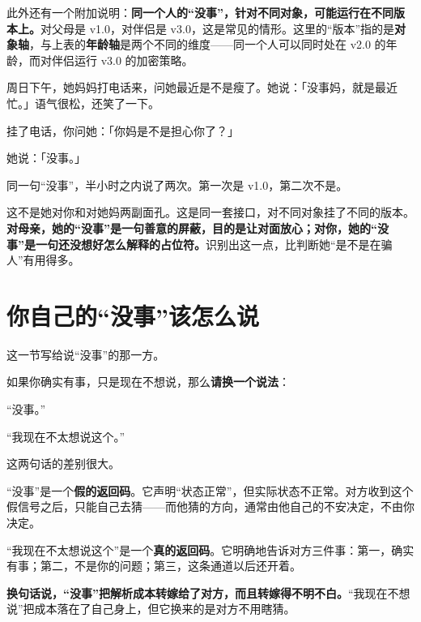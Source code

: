 此外还有一个附加说明：\textbf{同一个人的“没事”，针对不同对象，可能运行在不同版本上。}对父母是 v1.0，对伴侣是 v3.0，这是常见的情形。这里的“版本”指的是\textbf{对象轴}，与上表的\textbf{年龄轴}是两个不同的维度——同一个人可以同时处在 v2.0 的年龄，而对伴侣运行 v3.0 的加密策略。

\par
\begin{mdquote}
周日下午，她妈妈打电话来，问她最近是不是瘦了。她说：「没事妈，就是最近忙。」语气很松，还笑了一下。\par
\vspace{0.3\baselineskip}
挂了电话，你问她：「你妈是不是担心你了？」\par
\vspace{0.3\baselineskip}
她说：「没事。」\par
\vspace{0.3\baselineskip}
同一句“没事”，半小时之内说了两次。第一次是 v1.0，第二次不是。\par
\end{mdquote}

这不是她对你和对她妈两副面孔。这是同一套接口，对不同对象挂了不同的版本。\textbf{对母亲，她的“没事”是一句善意的屏蔽，目的是让对面放心；对你，她的“没事”是一句还没想好怎么解释的占位符。}识别出这一点，比判断她“是不是在骗人”有用得多。

\section{你自己的“没事”该怎么说}

这一节写给说“没事”的那一方。

如果你确实有事，只是现在不想说，那么\textbf{请换一个说法}：

\begin{mdquote}
“没事。”\par
\vspace{0.3\baselineskip}
“我现在不太想说这个。”
\end{mdquote}

这两句话的差别很大。

“没事”是一个\textbf{假的返回码}。它声明“状态正常”，但实际状态不正常。对方收到这个假信号之后，只能自己去猜——而他猜的方向，通常由他自己的不安决定，不由你决定。

“我现在不太想说这个”是一个\textbf{真的返回码}。它明确地告诉对方三件事：第一，确实有事；第二，不是你的问题；第三，这条通道以后还开着。

\textbf{换句话说，“没事”把解析成本转嫁给了对方，而且转嫁得不明不白。}“我现在不想说”把成本落在了自己身上，但它换来的是对方不用瞎猜。


